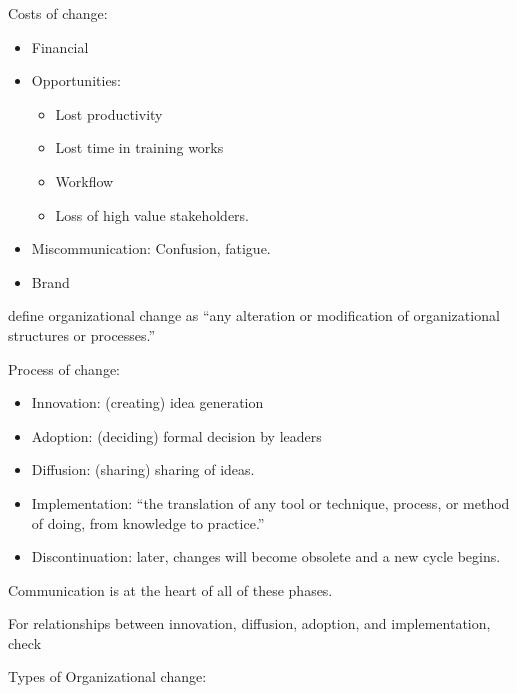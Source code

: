 \documentclass[
]{book}
\providecommand{\tightlist}{%
  \setlength{\itemsep}{0pt}\setlength{\parskip}{0pt}}
\begin{document}
Costs of change:

\begin{itemize}
\item
  Financial
\item
  Opportunities:

  \begin{itemize}
  \tightlist
  \item
    Lost productivity
  \item
    Lost time in training works
  \item
    Workflow
  \item
    Loss of high value stakeholders.
  \end{itemize}
\item
  Miscommunication: Confusion, fatigue.
\item
  Brand
\end{itemize}

\citep[p.10]{Zorn_1999} define organizational change as ``any alteration or modification of organizational structures or
processes.''

Process of change:

\begin{itemize}
\tightlist
\item
  Innovation: (creating) idea generation
\item
  Adoption: (deciding) formal decision by leaders
\item
  Diffusion: (sharing) sharing of ideas.
\item
  Implementation: ``the translation of any tool or technique, process, or method of doing, from knowledge to practice.''
  \citep{Tornatzky_1982}
\item
  Discontinuation: later, changes will become obsolete and a new cycle begins.
\end{itemize}

Communication is at the heart of all of these phases.

For relationships between innovation, diffusion, adoption, and implementation, check \citep[pp.~35]{Lewis_2019}

Types of Organizational change:
\end{document}
